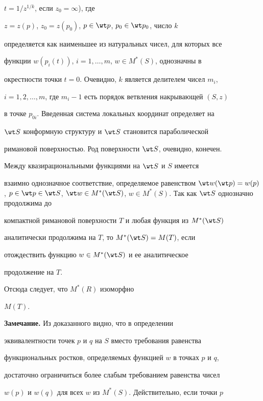 \begin{pf}
$t=1/z^{1/k}$, если $z_0=\infty$), где


$z=z(p)$, $z_0=z(p_0)$, $p\in \wt p$, $p_0\in\wt p_0$, число $k$


определяется как наименьшее из натуральных чисел, для которых все


функции $w(p_i(t))$, $i=1,\dotsc,m$, $w\in M^*(S)$, однозначны в


окрестности точки $t=0$. Очевидно, $k$ является делителем чисел $m_i$,


$i=1,2,\dotsc,m$, где $m_i-1$ есть порядок ветвления накрывающей $(S,z)$


в точке $p_{0i}$. Введенная система локальных координат определяет на


$\wt S$ конформную структуру и $\wt S$ становится параболической


римановой поверхностью. Род поверхности $\wt S$, очевидно, конечен.





Между квазирациональными функциями на $\wt S$ и $S$ имеется


взаимно однозначное соответствие, определяемое равенством $\wt


w(\wt p)=w(p)$, $p\in \wt p\in\wt S$, $\wt w\in M^*(\wt


S)$, $w\in M^*(S)$. Так как $\wt S$ однозначно продолжима до


компактной римановой поверхности $T$ и любая функция из $M^*(\wt S)$


аналитически продолжима на $T$, то $M^*(\wt S)=M(T)$, если


отождествить функцию $w\in M^*(\wt S)$ и ее аналитическое


продолжение на $T$.


Отсюда следует, что $M^*(R)$ изоморфно


$M(T)$.


\end{pf}





{\bf Замечание.} Из доказанного видно, что в определении


эквивалентности точек $p$ и $q$ на $S$ вместо требования равенства


функциональных ростков, определяемых функцией $w$ в точках $p$ и $q$,


достаточно ограничиться более слабым требованием равенства чисел


$w(p)$ и $w(q)$ для всех $w$ из $M^*(S)$. Действительно, если точки $p$


